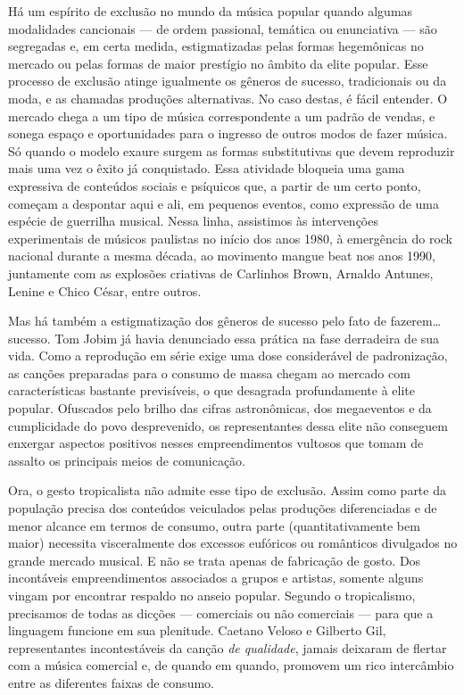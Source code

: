 Há um espírito de exclusão no mundo da música popular quando algumas
modalidades cancionais --- de ordem passional, temática ou enunciativa
--- são segregadas e, em certa medida, estigmatizadas pelas formas
hegemônicas no mercado ou pelas formas de maior prestígio no âmbito da
elite popular. Esse processo de exclusão atinge igualmente os gêneros de
sucesso, tradicionais ou da moda, e as chamadas produções alternativas.
No caso destas, é fácil entender. O mercado chega a um tipo de música
correspondente a um padrão de vendas, e sonega espaço e oportunidades
para o ingresso de outros modos de fazer música. Só quando o modelo
exaure surgem as formas substitutivas que devem reproduzir mais uma vez
o êxito já conquistado. Essa atividade bloqueia uma gama expressiva de
conteúdos sociais e psíquicos que, a partir de um certo ponto, começam a
despontar aqui e ali, em pequenos eventos, como expressão de uma espécie
de guerrilha musical. Nessa linha, assistimos às intervenções
experimentais de músicos paulistas no início dos anos 1980, à emergência
do rock nacional durante a mesma década, ao movimento mangue beat nos
anos 1990, juntamente com as explosões criativas de Carlinhos Brown,
Arnaldo Antunes, Lenine e Chico César, entre outros.

Mas há também a estigmatização dos gêneros de sucesso pelo fato de
fazerem\ldots sucesso. Tom Jobim já havia denunciado essa prática na fase
derradeira de sua vida. Como a reprodução em série exige uma dose
considerável de padronização, as canções preparadas para o consumo de
massa chegam ao mercado com características bastante previsíveis, o que
desagrada profundamente à elite popular. Ofuscados pelo brilho das
cifras astronômicas, dos megaeventos e da cumplicidade do povo
desprevenido, os representantes dessa elite não conseguem enxergar
aspectos positivos nesses empreendimentos vultosos que tomam de assalto
os principais meios de comunicação.

Ora, o gesto tropicalista não admite esse tipo de exclusão. Assim como
parte da população precisa dos conteúdos veiculados pelas produções
diferenciadas e de menor alcance em termos de consumo, outra parte
(quantitativamente bem maior) necessita visceralmente dos excessos
eufóricos ou românticos divulgados no grande mercado musical. E não se
trata apenas de fabricação de gosto. Dos incontáveis empreendimentos
associados a grupos e artistas, somente alguns vingam por encontrar
respaldo no anseio popular. Segundo o tropicalismo, precisamos de todas
as dicções --- comerciais ou não comerciais --- para que a linguagem
funcione em sua plenitude. Caetano Veloso e Gilberto Gil, representantes
incontestáveis da canção \textit{de qualidade}, jamais deixaram de flertar
com a música comercial e, de quando em quando, promovem um rico
intercâmbio entre as diferentes faixas de consumo.

